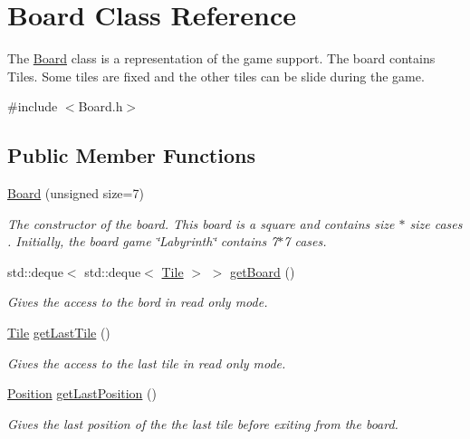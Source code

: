 \hypertarget{classBoard}{}\section{Board Class Reference}
\label{classBoard}


The \mbox{\hyperlink{classBoard}{Board}} class is a representation of the game support. The board contains Tiles. Some tiles are fixed and the other tiles can be slide during the game.  




{\ttfamily \#include $<$Board.\+h$>$}

\subsection*{Public Member Functions}
\begin{DoxyCompactItemize}
\item 
\mbox{\hyperlink{classBoard_af3091ef5b079f7481c9938192794cf9f}{Board}} (unsigned size=7)
\begin{DoxyCompactList}\small\item\em The constructor of the board. This board is a square and contains size $\ast$ size cases . Initially, the board game \char`\"{}\+Labyrinth\char`\"{} contains 7$\ast$7 cases. \end{DoxyCompactList}\item 
std\+::deque$<$ std\+::deque$<$ \mbox{\hyperlink{classTile}{Tile}} $>$ $>$ \mbox{\hyperlink{classBoard_a6b286d61f93eb094b64bd10d16888907}{get\+Board}} ()
\begin{DoxyCompactList}\small\item\em Gives the access to the bord in read only mode. \end{DoxyCompactList}\item 
\mbox{\hyperlink{classTile}{Tile}} \mbox{\hyperlink{classBoard_a4c413c90078b3a5bfed50a454ea53ffb}{get\+Last\+Tile}} ()
\begin{DoxyCompactList}\small\item\em Gives the access to the last tile in read only mode. \end{DoxyCompactList}\item 
\mbox{\hyperlink{structPosition}{Position}} \mbox{\hyperlink{classBoard_a31d74fd92f5ad77d4a8e58a8be8a7d3c}{get\+Last\+Position}} ()
\begin{DoxyCompactList}\small\item\em Gives the last position of the the last tile before exiting from the board. \end{DoxyCompactList}\item 

\end{DoxyCompactItemize}

